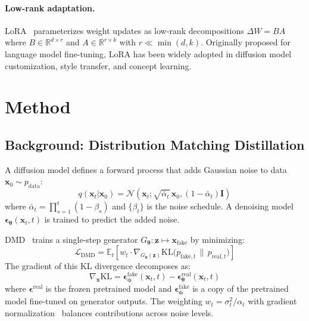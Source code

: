 \documentclass{article}
\theoremstyle{plain}
\theoremstyle{remark}
\newcommand{\R}{\mathbb{R}}
\newcommand{\E}{\mathbb{E}}
\newcommand{\KL}{\mathrm{KL}}
\newcommand{\bx}{\mathbf{x}}
\newcommand{\bz}{\mathbf{z}}
\newcommand{\bepsilon}{\boldsymbol{\epsilon}}
\newcommand{\btheta}{\boldsymbol{\theta}}
\newcommand{\bphi}{\boldsymbol{\phi}}
\begin{document}
\paragraph{Low-rank adaptation.}
LoRA~\citep{hu2022lora} parameterizes weight updates as low-rank decompositions $\Delta W = BA$ where $B \in \R^{d \times r}$ and $A \in \R^{r \times k}$ with $r \ll \min(d, k)$. Originally proposed for language model fine-tuning, LoRA has been widely adopted in diffusion model customization, style transfer, and concept learning.

\section{Method}
\label{sec:method}

\subsection{Background: Distribution Matching Distillation}
\label{sec:background}

A diffusion model defines a forward process that adds Gaussian noise to data $\bx_0 \sim p_{\text{data}}$:
\begin{equation}
q(\bx_t | \bx_0) = \mathcal{N}(\bx_t; \sqrt{\bar\alpha_t}\, \bx_0, (1 - \bar\alpha_t)\mathbf{I})
\label{eq:forward}
\end{equation}
where $\bar\alpha_t = \prod_{s=1}^t (1 - \beta_s)$ and $\{\beta_t\}$ is the noise schedule. A denoising model $\bepsilon_{\btheta}(\bx_t, t)$ is trained to predict the added noise.

DMD~\citep{yin2024onestep} trains a single-step generator $G_{\btheta}: \bz \mapsto \bx_{\text{fake}}$ by minimizing:
\begin{equation}
\mathcal{L}_{\text{DMD}} = \E_t\left[w_t \cdot \nabla_{G_{\btheta}(\bz)} \KL\bigl(p_{\text{fake},t} \,\|\, p_{\text{real},t}\bigr)\right]
\label{eq:dmd}
\end{equation}
The gradient of this KL divergence decomposes as:
\begin{equation}
\nabla_{\bx} \KL = \bepsilon_{\bphi}^{\text{fake}}(\bx_t, t) - \bepsilon_{\btheta}^{\text{real}}(\bx_t, t)
\label{eq:score_diff}
\end{equation}
where $\bepsilon^{\text{real}}$ is the frozen pretrained model and $\bepsilon^{\text{fake}}_{\bphi}$ is a copy of the pretrained model fine-tuned on generator outputs. The weighting $w_t = \sigma_t^2 / \alpha_t$ with gradient normalization~\citep{yin2024onestep} balances contributions across noise levels.
\end{document}
